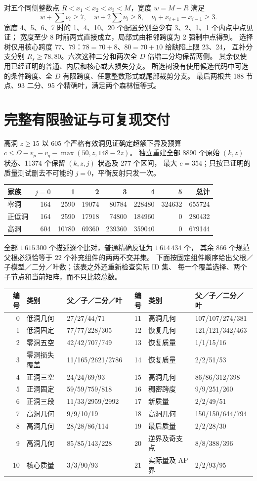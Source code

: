 \documentclass[11pt,a4paper]{article}
\theoremstyle{definition}
\begin{document}
对五个同侧整数点 $R<x_1<x_2<x_3<M$，宽度 $w=M-R$ 满足
\[
 w+\sum\nu_i\ge7,\quad w+2\sum\nu_i\ge8,\quad
 \nu_i+x_{i+1}-x_{i-1}\ge3.
\]
宽度 4、5、6、7 时的 1、4、10、20 个配置分别至少有 3、2、1、1 个内点中点见证；
宽度至少 8 时前两式直接成立，局部式由相邻跨度为 2 强制中点得到。
选择树仅用核心跨度 77、79：$78=70+8$、$80=70+10$ 给缺陷上限 23、24，
互补分支分别 $R_s\ge78,80$。六次这种二分和两次全 $D$ 倍增二分均保留两侧。
其余仅使用已经证明的普通、内层和核心或大损失分支。
所选树没有使用候选代码中可选的条件跨度、全 $D$ 有限跨度、任意整数形式或尾部裁剪分支。
最后两根共 188 节点、93 二分、95 个精确叶，满足两个森林恒等式。

\section{完整有限验证与可复现交付}\label{finite}
高洞 $z\ge15$ 以 605 个严格有效洞见证确定超额下界及预算
$c\le\Omega-v_p-v_q-\max(50,z,148-2z)$。
独立重建全部 8890 个原始 $(k,z)$ 状态、11374 个保留 $(k,z,j)$ 状态及 277 个区间，
最大 $c=354$；只按已证明的质量测试删去不可能的 $j=0$，平衡反射只发一次。
\begin{center}\begin{tabular}{lrrrrrrr}\toprule
家族&$j=0$&1&2&3&4&5&总计\\\midrule
零洞&164&2590&19074&80784&228480&324632&655724\\
正低洞&164&2590&17918&74800&184960&0&280432\\
高洞&604&10780&69360&239360&359040&0&679144\\\bottomrule
\end{tabular}\end{center}
全部 $1\,615\,300$ 个描述逐个比对，普通精确反证为 $1\,614\,434$ 个，
其余 866 个规范父根必须恰等于 22 个补充组件的两两不交并集。
下面按固定组件顺序给出父根／子模型／二分／叶数；该表之外还重新检查实际 ID 集、
每一个覆盖选择、两个子节点和当前矩阵，而不只比较总数。
\begin{center}\small\begin{tabular}{rll|rll}\toprule
编号&类别&父／子／二分／叶&编号&类别&父／子／二分／叶\\\midrule
0&低洞几何&27/27/44/71&11&高洞几何&107/107/274/381\\
1&低洞固定&77/77/228/305&12&恢复几何&121/121/342/463\\
2&零洞五空&42/42/707/749&13&恢复质量&1/1/15/16\\
3&零洞损失覆盖&11/165/2621/2786&14&恢复质量&2/2/51/53\\
4&正洞三空&24/24/69/93&15&高洞几何&86/86/312/398\\
5&正洞固定&59/59/759/818&16&稠密跨度&9/9/251/260\\
6&正洞三段&11/33/2959/2992&17&新质量&2/2/49/51\\
7&高洞几何&9/9/10/19&18&高洞几何&150/150/644/794\\
8&高洞几何&28/28/86/114&19&最后质量&2/2/28/30\\
9&高洞几何&85/85/143/228&20&逆界及奇支点&8/8/388/396\\
10&核心质量&3/3/90/93&21&实际量及 AP 界&2/2/93/95\\\bottomrule
\end{tabular}\end{center}
\end{document}

